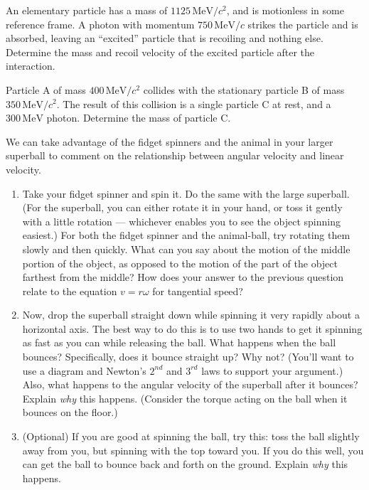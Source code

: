 \begin{exercise} 
  An elementary particle has a mass of   $1125\,\text{MeV}/c^2$,
  and is motionless in some reference frame.  A photon with momentum
  $750\,\text{MeV}/c$ strikes the particle and is absorbed, leaving
  an ``excited'' particle that is recoiling and nothing else.
  Determine the mass and recoil velocity of the excited particle after
  the interaction.
  \label{prob:photon_absorption}
\end{exercise}

\begin{exercise}  
  Particle A of mass $400\,\text{MeV}/c^2$ collides with the
  stationary particle B of mass $350\,\text{MeV}/c^2$.  The result of
  this collision is a single particle C at rest, and a
  $300\,\text{MeV}$ photon.  Determine the mass of particle C.
  \label{prob:light}
\end{exercise}


\begin{exercise}
  We can take advantage of the fidget spinners and the 
  animal in your
  larger superball to comment on the relationship between angular velocity
  and linear velocity.
  \begin{enumerate}
  \item Take your fidget spinner and spin it.  Do the same with the
    large superball. (For the superball, you can either rotate it in 
    your hand, or toss it
    gently with a little rotation --- whichever enables you to see the
    object spinning easiest.)  For both the fidget spinner and the
    animal-ball, try rotating them slowly and then quickly.  What
    can you say about the motion of the middle portion of the object,
    as opposed to the motion of the part of the object farthest from
    the middle?  How does your answer to the previous question relate
    to the equation $v = r\omega$ for tangential speed?

  \item Now, drop the superball straight down while spinning it very
    rapidly about a horizontal axis.  The best way to do this is to 
    use two hands to get it
    spinning as fast as you can while releasing the ball.  What
    happens when the ball bounces?  Specifically, does it bounce
    straight up?  Why not?  (You'll want to use a diagram and Newton's
    $2^{ nd}$ and $3^{ rd}$ laws to support your argument.)
    Also, what happens to the angular velocity of the superball after
    it bounces?  Explain \emph{why} this happens.  (Consider the torque
    acting on the ball when it bounces on the floor.)

  \item (Optional) If you are good at spinning the ball, try this:
    toss the ball slightly away from you, but spinning with the top
    toward you.  If you do this well, you can get the ball to bounce
    back and forth on the ground.  Explain \emph{why} this happens.

  \end{enumerate}
\end{exercise}

